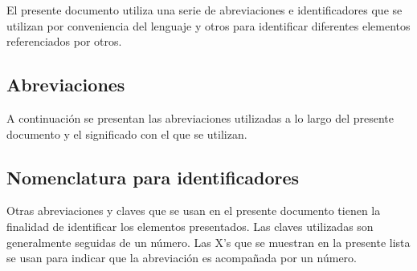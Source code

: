     El presente documento utiliza una serie de abreviaciones e identificadores que se utilizan por conveniencia del lenguaje y otros para identificar diferentes elementos referenciados por otros.

    \subsection{Abreviaciones}

	A continuación se presentan las abreviaciones utilizadas a lo largo del presente documento y el significado con el que se utilizan.

    \subsection{Nomenclatura para identificadores}

	Otras abreviaciones y claves que se usan en el presente documento tienen la finalidad de identificar los elementos presentados. Las claves utilizadas son generalmente seguidas de un número. Las X’s que se muestran en la presente lista se usan para indicar que la abreviación es acompañada por un número.

